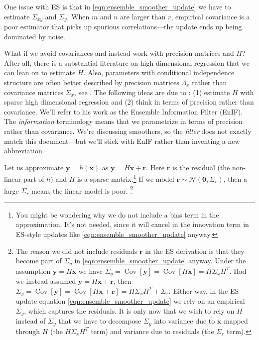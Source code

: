 \documentclass[12pt, a4paper]{article}
\theoremstyle{spaced}
\theoremstyle{spaceddef}
\numberwithin{equation}{section}
\begin{document}
One issue with ES is that in \cref{eqn:ensemble_smoother_update} we have to estimate $\Sigma_{xy}$ and $\Sigma_{y}$.
When $m$ and $n$ are larger than $r$, empirical covariance is a poor estimator that picks up spurious correlations---the update ends up being dominated by noise.

What if we avoid covariances and instead work with precision matrices and $H$?
After all, there is a substantial literature on high-dimensional regression that we can lean on to estimate $H$.
Also, parameters with conditional independence structure are often better described by precision matrices $\Lambda_x$ rather than covariance matrices $\Sigma_{x}$, see \citet[Chapter~2]{rue2005gaussian}.
The following ideas are due to \citet{lunde2025ensemble}:
(1) estimate $H$ with sparse high dimensional regression and
(2) think in terms of precision rather than covariance.
We'll refer to his work as the Ensemble Information Filter (EnIF).
The \emph{information} terminology means that we parametrize in terms of precision rather than covariance.
We're discussing smoothers, so the \emph{filter} does not exactly match this document---but we'll stick with EnIF rather than inventing a new abbreviation.

Let us approximate $\bm{y} = h(\bm{x})$ as $\bm{y} = H \bm{x} + \bm{r}$.
Here $\bm{r}$ is the residual (the non-linear part of $h$) and $H$ is a sparse matrix.\footnote{You might be wondering why we do not include a bias term in the approximation. It's not needed, since it will cancel in the innovation term in ES-style updates like \eqref{eqn:ensemble_smoother_update} anyway.}
If we model $\bm{r} \sim \mathcal{N}(\bm{0}, \Sigma_{r})$, then a large $\Sigma_{r}$ means the linear model is poor.
\footnote{The reason we did not include residuals $\bm{r}$ in the ES derivation is that they become part of $\Sigma_{y}$ in \eqref{eqn:ensemble_smoother_update} anyway.
Under the assumption $\bm{y} = H \bm{x}$ we have
$\Sigma_{y}
= \operatorname{Cov}\left[ \bm{y} \right]
= \operatorname{Cov}\left[ H \bm{x} \right]
= H \Sigma_{x} H^T$.
Had we instead assumed $\bm{y} = H \bm{x} + \bm{r}$, then
$\Sigma_{y}
= \operatorname{Cov}\left[ \bm{y} \right]
= \operatorname{Cov}\left[ H \bm{x} + \bm{r} \right]
= H \Sigma_{x} H^T + \Sigma_{r}$.
Either way, in the ES update equation \eqref{eqn:ensemble_smoother_update} we rely on an empirical $\Sigma_{y}$, which captures the residuals.
It is only now that we wish to rely on $H$ instead of $\Sigma_{y}$ that we have to decompose $\Sigma_{y}$ into variance due to $\bm{x}$ mapped through $H$ (the $H \Sigma_{x} H^T$ term) and variance due to residuals (the $\Sigma_{r}$ term).}
\end{document}
